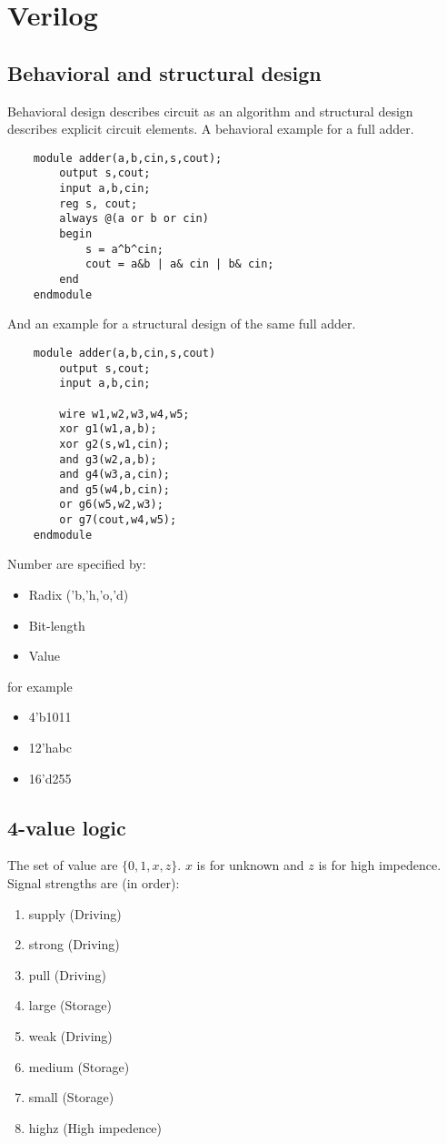 \chapter{Verilog}
\section{Behavioral and structural design}
\lstset{language = Verilog}

Behavioral design describes circuit as an algorithm and structural design describes explicit circuit elements. A behavioral example for a full adder.
\begin{lstlisting}
    module adder(a,b,cin,s,cout);
        output s,cout;
        input a,b,cin;
        reg s, cout;
        always @(a or b or cin)
        begin
            s = a^b^cin;
            cout = a&b | a& cin | b& cin;
        end
    endmodule
\end{lstlisting}

And an example for a structural design of the same full adder.
\begin{lstlisting}
    module adder(a,b,cin,s,cout)
        output s,cout;
        input a,b,cin;

        wire w1,w2,w3,w4,w5;
        xor g1(w1,a,b);
        xor g2(s,w1,cin);
        and g3(w2,a,b);
        and g4(w3,a,cin);
        and g5(w4,b,cin);
        or g6(w5,w2,w3);
        or g7(cout,w4,w5);
    endmodule
\end{lstlisting}
Number are specified by:
\begin{itemize}
    \item Radix ('b,'h,'o,'d)
    \item Bit-length
    \item Value
\end{itemize}
for example
\begin{itemize}
    \item 4'b1011
    \item 12'habc
    \item 16'd255
\end{itemize}



\section{4-value logic}
The set of value are \(\{0,1,x,z\}\). \(x\) is for unknown and \(z\) is for high impedence.
Signal strengths are (in order):
\begin{enumerate}
    \item supply (Driving)
    \item strong (Driving)
    \item pull (Driving)
    \item large (Storage)
    \item weak (Driving)
    \item medium (Storage)
    \item small (Storage)
    \item highz (High impedence)
\end{enumerate}

